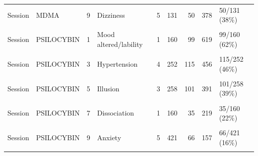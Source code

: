 \begin{table}[!h]
{\begin{tabular}[t]{llrlrrrrl}
Session & MDMA & 9 & Dizziness & 5 & 131 & 50 & 378 & 50/131 (38\%)\\
\cellcolor{gray!10}{Session} & \cellcolor{gray!10}{MDMA} & \cellcolor{gray!10}{10} & \cellcolor{gray!10}{Fatigue} & \cellcolor{gray!10}{8} & \cellcolor{gray!10}{169} & \cellcolor{gray!10}{60} & \cellcolor{gray!10}{357} & \cellcolor{gray!10}{60/169 (36\%)}\\
\addlinespace
Session & PSILOCYBIN & 1 & Mood altered/lability & 1 & 160 & 99 & 619 & 99/160 (62\%)\\
\cellcolor{gray!10}{Session} & \cellcolor{gray!10}{PSILOCYBIN} & \cellcolor{gray!10}{2} & \cellcolor{gray!10}{Vivid imagination} & \cellcolor{gray!10}{1} & \cellcolor{gray!10}{160} & \cellcolor{gray!10}{89} & \cellcolor{gray!10}{556} & \cellcolor{gray!10}{89/160 (56\%)}\\
Session & PSILOCYBIN & 3 & Hypertension & 4 & 252 & 115 & 456 & 115/252 (46\%)\\
\cellcolor{gray!10}{Session} & \cellcolor{gray!10}{PSILOCYBIN} & \cellcolor{gray!10}{4} & \cellcolor{gray!10}{Headache} & \cellcolor{gray!10}{9} & \cellcolor{gray!10}{530} & \cellcolor{gray!10}{239} & \cellcolor{gray!10}{451} & \cellcolor{gray!10}{239/530 (45\%)}\\
Session & PSILOCYBIN & 5 & Illusion & 3 & 258 & 101 & 391 & 101/258 (39\%)\\
\addlinespace
\cellcolor{gray!10}{Session} & \cellcolor{gray!10}{PSILOCYBIN} & \cellcolor{gray!10}{6} & \cellcolor{gray!10}{Nausea} & \cellcolor{gray!10}{8} & \cellcolor{gray!10}{504} & \cellcolor{gray!10}{130} & \cellcolor{gray!10}{258} & \cellcolor{gray!10}{130/504 (26\%)}\\
Session & PSILOCYBIN & 7 & Dissociation & 1 & 160 & 35 & 219 & 35/160 (22\%)\\
\cellcolor{gray!10}{Session} & \cellcolor{gray!10}{PSILOCYBIN} & \cellcolor{gray!10}{8} & \cellcolor{gray!10}{Pseudohallucination} & \cellcolor{gray!10}{1} & \cellcolor{gray!10}{160} & \cellcolor{gray!10}{33} & \cellcolor{gray!10}{206} & \cellcolor{gray!10}{33/160 (21\%)}\\
Session & PSILOCYBIN & 9 & Anxiety & 5 & 421 & 66 & 157 & 66/421 (16\%)\\
\cellcolor{gray!10}{Session} & \cellcolor{gray!10}{PSILOCYBIN} & \cellcolor{gray!10}{10} & \cellcolor{gray!10}{Temperature perception disturbances} & \cellcolor{gray!10}{2} & \cellcolor{gray!10}{186} & \cellcolor{gray!10}{26} & \cellcolor{gray!10}{140} & \cellcolor{gray!10}{26/186 (14\%)}\\
\bottomrule
\end{tabular}}
\end{table}

